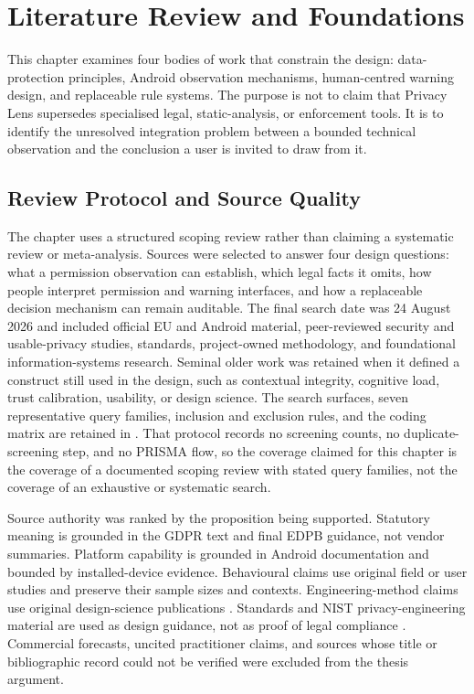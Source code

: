\chapter{Literature Review and Foundations}

This chapter examines four bodies of work that constrain the design: data-protection principles, Android observation mechanisms, human-centred warning design, and replaceable rule systems. The purpose is not to claim that Privacy Lens supersedes specialised legal, static-analysis, or enforcement tools. It is to identify the unresolved integration problem between a bounded technical observation and the conclusion a user is invited to draw from it.

\section{Review Protocol and Source Quality}

The chapter uses a structured scoping review rather than claiming a systematic review or meta-analysis. Sources were selected to answer four design questions: what a permission observation can establish, which legal facts it omits, how people interpret permission and warning interfaces, and how a replaceable decision mechanism can remain auditable. The final search date was 24 August 2026 and included official EU and Android material, peer-reviewed security and usable-privacy studies, standards, project-owned methodology, and foundational information-systems research. Seminal older work was retained when it defined a construct still used in the design, such as contextual integrity, cognitive load, trust calibration, usability, or design science. The search surfaces, seven representative query families, inclusion and exclusion rules, and the coding matrix are retained in . That protocol records no screening counts, no duplicate-screening step, and no PRISMA flow, so the coverage claimed for this chapter is the coverage of a documented scoping review with stated query families, not the coverage of an exhaustive or systematic search.

Source authority was ranked by the proposition being supported. Statutory meaning is grounded in the GDPR text and final EDPB guidance, not vendor summaries. Platform capability is grounded in Android documentation and bounded by installed-device evidence. Behavioural claims use original field or user studies and preserve their sample sizes and contexts. Engineering-method claims use original design-science publications \cite{hevner2004,peffers2007}. Standards and NIST privacy-engineering material are used as design guidance, not as proof of legal compliance \cite{nist8062,nistPrivacyFramework2020}. Commercial forecasts, uncited practitioner claims, and sources whose title or bibliographic record could not be verified were excluded from the thesis argument.

